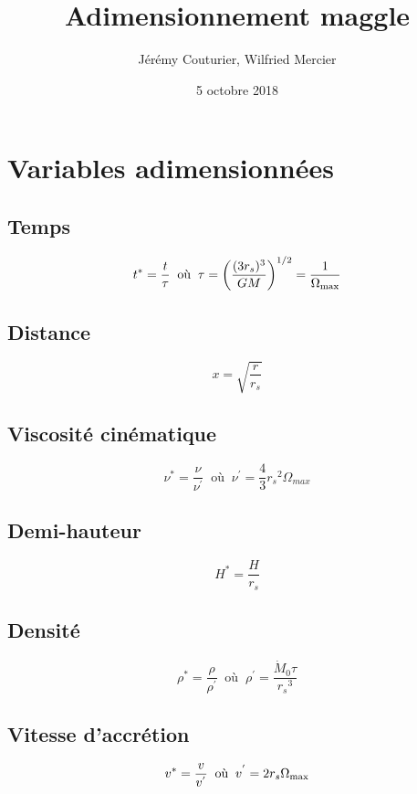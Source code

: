 \documentclass[a4paper,11pt]{article}
\title{Adimensionnement maggle}
\author{Jérémy Couturier, Wilfried Mercier}
\date{5 octobre 2018}
\begin{document}
\maketitle

\section{Variables adimensionnées}
\subsection{Temps}
    \begin{equation}
        t^*=\frac{t}{\tau}\;\; \textrm{où} \;\;\tau=\left ( \frac{(3r_s)^3}{GM} \right)^{1/2} = \frac{1}{\Omega_{\rm{max}}}
    \end{equation}

\subsection{Distance}
    \begin{equation}
        x=\sqrt{\frac{r}{r_s}}
    \end{equation}
    
\subsection{Viscosité cinématique}
    \begin{equation}
        \nu^*=\frac{\nu}{\nu^{'}}\;\; \textrm{où} \;\;\nu^{'}=\frac{4}{3}{r_s}^2\Omega_{max}
    \end{equation}
    
\subsection{Demi-hauteur}
    \begin{equation}
        H^*=\frac{H}{r_s}
    \end{equation}

\subsection{Densité}
    \begin{equation}
        \rho^*=\frac{\rho}{\rho^{'}}\;\; \textrm{où} \;\;\rho^{'}=\frac{\dot{M}_0\tau}{{r_s}^3}
    \end{equation}
    
\subsection{Vitesse d'accrétion}
    \begin{equation}
        v^* = \frac{v}{v^{'}}\;\; \textrm{où} \;\;v^{'} = 2 r_s \Omega_{\rm{max}}
    \end{equation}
    
\end{document}
